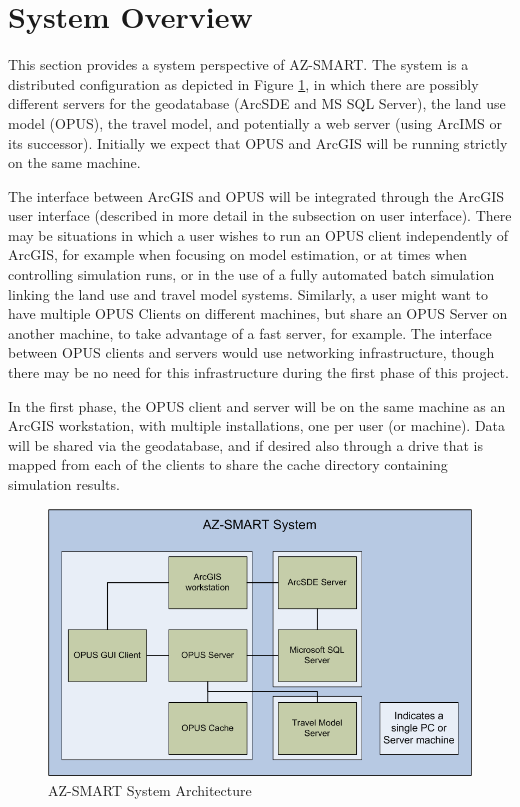 \section{System Overview}
This section provides a system perspective of AZ-SMART.  The system
is a distributed configuration as depicted in Figure
\ref{figSystem}, in which there are possibly different servers for
the geodatabase (ArcSDE and MS SQL Server), the land use model
(OPUS), the travel model, and potentially a web server (using ArcIMS
or its successor).  Initially we expect that OPUS and ArcGIS will be
running strictly on the same machine.

The interface between ArcGIS and OPUS will be integrated through the ArcGIS user interface (described in more detail in the subsection on
user interface).  There may be situations in which a user wishes to run an OPUS client independently of ArcGIS, for example when focusing
on model estimation, or at times when controlling simulation runs, or in the use of a fully automated batch simulation linking the land
use and travel model systems.  Similarly, a user might want to have multiple OPUS Clients on different machines, but share an OPUS Server
on another machine, to take advantage of a fast server, for example.  The interface between OPUS clients and servers would use networking
infrastructure, though there may be no need for this infrastructure during the first phase of this project.

In the first phase, the OPUS client and server will be on the same
machine as an ArcGIS workstation, with multiple installations, one
per user (or machine).  Data will be shared via the geodatabase, and
if desired also through a drive that is mapped from each of the
clients to share the cache directory containing simulation results.

\begin{figure}[h]
\begin{center}
\includegraphics[scale=0.5]{figures/AZ-SMART_system_diagram.png}
\caption{AZ-SMART System Architecture}
\label{figSystem}
\end{center}
\end{figure}

